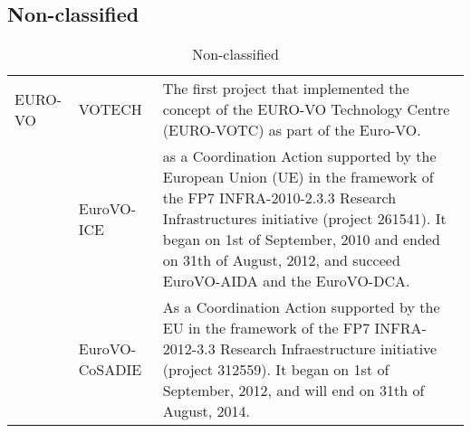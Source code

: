\subsection{Non-classified}
\begin{table*}[h!t]
	\centering
	\begin{tabular}{|l|l|p{12.5cm}|}
	\hline
	EURO-VO	& VOTECH & The first project that implemented the concept of the EURO-VO Technology Centre (EURO-VOTC) as part of the Euro-VO.\\
			& EuroVO-ICE & as a Coordination Action supported by the European Union (UE) in the framework of the FP7 INFRA-2010-2.3.3 Research 
					Infrastructures initiative (project 261541). It began on 1st of September, 2010 and ended on 31th of August, 2012, and succeed 
					EuroVO-AIDA and the EuroVO-DCA.\\
			& EuroVO-CoSADIE & As a Coordination Action supported by the EU in the framework of the FP7 INFRA-2012-3.3 Research Infraestructure 
					initiative (project 312559). It began on 1st of September, 2012, and will end on 31th of August, 2014.\\
	\hline
	\end{tabular}
	\caption{Non-classified}
	\label{table:nc}
\end{table*}




